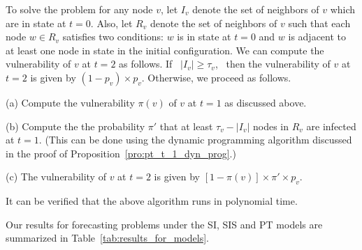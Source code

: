 To solve the \TwoVuls{} problem for any node $v$, 
let $I_v$ denote the set of neighbors of $v$
which are in state \istate{} at $t = 0$.
Also, let $R_v$ denote the set of neighbors of $v$ such that 
each node $w \in R_v$ satisfies two conditions: 
$w$ is in state \sstate{} at $t = 0$ 
and $w$ is adjacent to 
at least one node in state \istate{} in the initial configuration.
We can compute the vulnerability of $v$ at $t = 2$ as follows.
If~ $|I_v| \geq \tau_v$,~ then the vulnerability of $v$ at $t = 2$ is 
given by  $(1-p_v) \times p_v$. 
Otherwise, we proceed as follows.
\begin{description}
\item{(a)} Compute the vulnerability $\pi(v)$ of $v$ at $t = 1$ as discussed above.
\item{(b)} Compute the the probability $\pi'$ that at least $\tau_v - |I_v|$ nodes in $R_v$ 
           are infected at $t = 1$.  (This can be done using the dynamic programming
           algorithm discussed in the proof of Proposition~\ref{pro:pt_t_1_dyn_prog}.)
\item{(c)} The vulnerability of $v$ at $t = 2$ is given by 
           $[1-\pi(v)] \times \pi' \times p_v$. 
\end{description}
It can be verified that the above algorithm runs in polynomial time.
\QED

Our results for forecasting problems under the SI, SIS and PT models
are summarized in Table~\ref{tab:results_for_models}.

